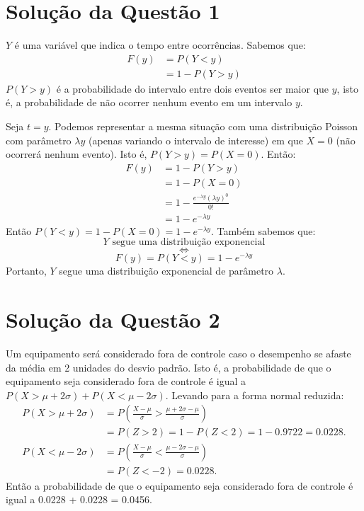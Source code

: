 \documentclass[
	12pt,				%
	openright,			%
	oneside,			%
	a4paper,			%
	english,			%
	brazil,				%
	]{abntex2}
\begin{document}
\imprimircapa
\textual

\section{Solução da Questão 1}
$Y$ é uma variável que indica o tempo entre ocorrências. Sabemos que:
\begin{align*}
    F(y) &= P(Y < y)\\
    &= 1 - P(Y > y)
\end{align*}
$P(Y > y)$ é a probabilidade do intervalo entre dois eventos ser maior que $y$, isto é, a probabilidade de não ocorrer nenhum evento em um intervalo $y$.

Seja $t = y$. Podemos representar a mesma situação com uma distribuição Poisson com parâmetro $\lambda y$ (apenas variando o intervalo de interesse) em que $X = 0$ (não ocorrerá nenhum evento). Isto é, $P(Y > y) = P(X = 0)$. Então:
\begin{align*}
    F(y) &= 1 - P(Y > y)\\
    &= 1 - P(X = 0)\\
    &= 1 - \frac{e^{-\lambda y}(\lambda y)^0}{0!}\\
    &= 1 - e^{-\lambda y}
\end{align*}
Então $P(Y < y) = 1 - P(X = 0)= 1 - e^{-\lambda y}$. Também sabemos que:
    $$Y \text{ segue uma distribuição exponencial}$$
    $$\iff$$
    $$F(y) = P(Y < y) = 1 - e^{-\lambda y}$$
Portanto, $Y$ segue uma distribuição exponencial de parâmetro $\lambda$.

\section{Solução da Questão 2}
Um equipamento será considerado fora de controle caso o desempenho se afaste da média em 2 unidades do desvio padrão. Isto é, a probabilidade de que o equipamento seja considerado fora de controle é igual a $P(X > \mu + 2\sigma) + P(X < \mu - 2\sigma)$. Levando para a forma normal reduzida:
\begin{align*}
    P(X > \mu + 2\sigma) &= P\left(\frac{X - \mu}{\sigma} > \frac{\mu + 2\sigma - \mu}{\sigma}\right)\\
    &= P(Z > 2) = 1 - P(Z < 2) = 1 - 0.9722 = 0.0228.\\[1em]
    P(X < \mu - 2\sigma) &= P\left(\frac{X - \mu}{\sigma} < \frac{\mu - 2\sigma - \mu}{\sigma}\right)\\
    &= P(Z < -2) = 0.0228.
\end{align*}
Então a probabilidade de que o equipamento seja considerado fora de controle é igual a 0.0228 + 0.0228 = 0.0456.
\end{document}
